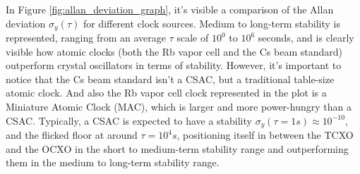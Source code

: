 In Figure \ref{fig:allan_deviation_graph}, it's visible a comparison of the Allan deviation $\sigma_y(\tau)$ for different clock sources.
Medium to long-term stability is represented, ranging from an average $\tau$ scale of $10^{0}$ to $10^{6}$ seconds, and is clearly visible how atomic clocks (both the Rb vapor cell and the Cs beam standard) outperform crystal oscillators in terms of stability.
However, it's important to notice that the Cs beam standard isn't a CSAC, but a traditional table-size atomic clock.
And also the Rb vapor cell clock represented in the plot is a Miniature Atomic Clock (MAC), which is larger and more power-hungry than a CSAC.
Typically, a CSAC is expected to have a stability $\sigma_y(\tau=1s) \approx 10^{-10}$, and the flicked floor at around $\tau = 10^4s$, positioning itself in between the TCXO and the OCXO in the short to medium-term stability range and outperforming them in the medium to long-term stability range.





